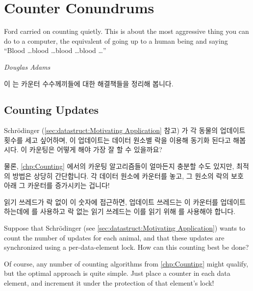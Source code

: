 
\section{Counter Conundrums}
\label{sec:together:Counter Conundrums}
%
\epigraph{Ford carried on counting quietly.
	  This is about the most aggressive thing you can do to a
	  computer, the equivalent of going up to a human being and saying
	  ``Blood \dots blood \dots blood \dots blood \dots''}
	 {\emph{Douglas Adams}}

이  는 카운터 수수께끼들에 대한
해결책들을 정리해 봅니다.

\iffalse

This \lcnamecref{sec:together:Counter Conundrums}
outlines solutions to counter conundrums.

\fi

\subsection{Counting Updates}
\label{sec:together:Counting Updates}

Schr\"odinger
(\cref{sec:datastruct:Motivating Application} 참고) 가 각 동물의 업데이트
횟수를 세고 싶어하며, 이 업데이트는 데이터 원소별 락을 이용해 동기화 된다고
해봅시다.
이 카운팅은 어떻게 해야 가장 잘 할 수 있을까요?

물론, \cref{chp:Counting} 에서의 카운팅 알고리즘들이 얼마든지 충분할 수도
있지만, 최적의 방법은 상당히 간단합니다.
각 데이터 원소에 카운터를 놓고, 그 원소의 락의 보호 아래 그 카운터를 증가시키는
겁니다!

읽기 쓰레드가 락 없이 이 숫자에 접근하면, 업데이트 쓰레드는 이 카운터를
업데이트 하는데에  를 사용하고 락 없는 읽기 쓰레드는 이를 읽기
위해  를 사용해야 합니다.

\iffalse

Suppose that Schr\"odinger (see
\cref{sec:datastruct:Motivating Application})
wants to count the number of updates for each animal,
and that these updates are synchronized using a per-data-element lock.
How can this counting best be done?

Of course, any number of counting algorithms from \cref{chp:Counting}
might qualify, but the optimal approach is quite simple.
Just place a counter in each data element, and increment it under the
protection of that element's lock!

